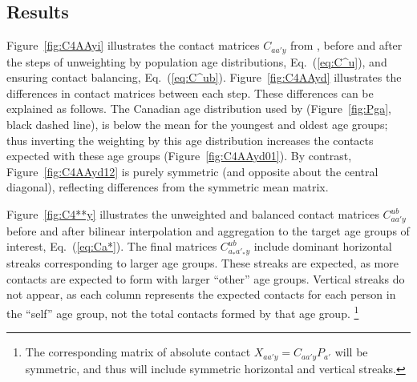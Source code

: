 \subsection{Results}\label{ex:results}
Figure~\ref{fig:C4AAyi} illustrates the contact matrices $C_{aa'y}$ from \citet{Prem2021},
before and after the steps of unweighting by population age distributions, Eq.~(\ref{eq:C^u}),
and ensuring contact balancing, Eq.~(\ref{eq:C^ub}).
Figure~\ref{fig:C4AAyd} illustrates the differences in contact matrices between each step.
These differences can be explained as follows.
The Canadian age distribution used by \citet{Prem2021} (Figure~\ref{fig:Pga}, black dashed line),
is below the mean for the youngest and oldest age groups;
thus inverting the weighting by this age distribution
increases the contacts expected with these age groups (Figure~\ref{fig:C4AAyd01}).
By contrast, Figure~\ref{fig:C4AAyd12} is purely symmetric (and opposite about the central diagonal),
reflecting differences from the symmetric mean matrix.
\par
Figure~\ref{fig:C4**y} illustrates the unweighted and balanced contact matrices $C^{ub}_{aa'y}$
before and after bilinear interpolation and aggregation to the target age groups of interest, Eq.~(\ref{eq:Ca*}).
The final matrices $C^{ub}_{a_*a'_*y}$ include dominant horizontal streaks corresponding to larger age groups.
These streaks are expected, as more contacts are expected to form with larger ``other'' age groups.
Vertical streaks do not appear, as each column represents
the expected contacts for each person in the ``self'' age group,
not the total contacts formed by that age group.%
\footnote{The corresponding matrix of absolute contact $X_{aa'y} = C_{aa'y} P_{a'}$
  will be symmetric, and thus will include symmetric horizontal and vertical streaks.}
